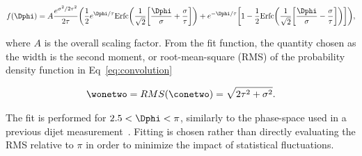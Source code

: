 \begin{eqnarray}
f(\Dphi) = A\frac{e^{\sigma^2/2\tau^2}}{2\tau}\bigg(\frac{1}{2}e^{\Dphi/ \tau}\mathrm{Erfc}\bigg(\frac{1}{\sqrt{2}}\bigg[\frac{\Dphi}{\sigma}+\frac{\sigma}{\tau}\bigg]\bigg)+e^{-\Dphi/\tau}\bigg[1-\frac{1}{2}\mathrm{Erfc}\bigg(\frac{1}{\sqrt{2}}\bigg[\frac{\Dphi}{\sigma}-\frac{\sigma}{\tau}\bigg]\bigg)\bigg]\bigg),
\label{eq:fitfcn}
\end{eqnarray} 

where $A$ is the overall scaling factor. From the fit function, the quantity chosen as the width is the second moment, or root-mean-square (RMS) of the probability density function in Eq~\ref{eq:convolution} 

\begin{eqnarray}
\wonetwo = RMS(\conetwo) =  \sqrt{2\tau^2 + \sigma^{2}}.
\end{eqnarray}

The fit is performed for $2.5<\Dphi<\pi$, similarly to the phase-space used in a previous dijet measurement~\cite{Chatrchyan:2014hqa}. Fitting is chosen rather than directly evaluating the RMS relative to $\pi$ in order to minimize the impact of statistical fluctuations.  






\FloatBarrier
